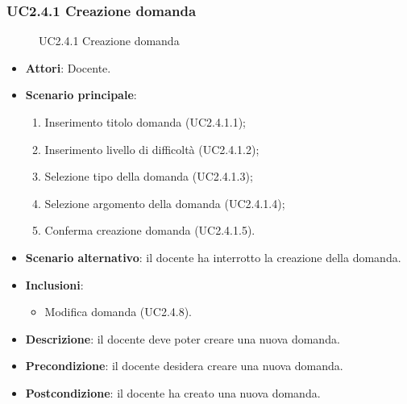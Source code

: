 \subsubsection{UC2.4.1 Creazione domanda}
\begin{figure}[H]
\centering
\noindent{}
\caption{UC2.4.1 Creazione domanda}
\end{figure}
\begin{itemize}
\item \textbf{Attori}: Docente.
\item \textbf{Scenario principale}:
\begin{enumerate}
\item Inserimento titolo domanda (UC2.4.1.1);
\item Inserimento livello di difficoltà  (UC2.4.1.2);
\item Selezione tipo della domanda (UC2.4.1.3);
\item Selezione argomento della domanda (UC2.4.1.4);
\item Conferma creazione domanda (UC2.4.1.5).
\end{enumerate}
\item \textbf{Scenario alternativo}: il docente ha interrotto la creazione della domanda.
\item \textbf{Inclusioni}:
\begin{itemize}
\item Modifica domanda (UC2.4.8).
\end{itemize}
\item \textbf{Descrizione}: il docente deve poter creare una nuova domanda.
\item \textbf{Precondizione}: il docente desidera creare una nuova domanda.
\item \textbf{Postcondizione}: il docente ha creato una nuova domanda.
\end{itemize}
